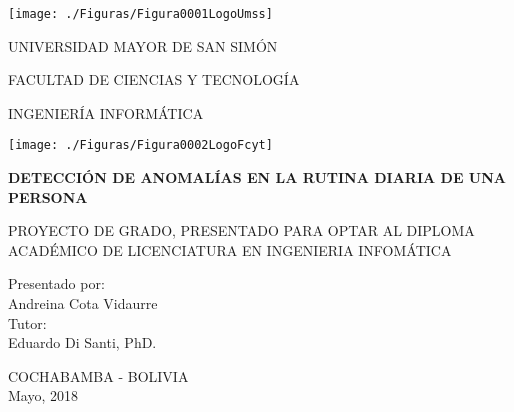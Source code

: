 \begin{titlepage}

\begin{minipage}[l]{.15\linewidth}
\texttt{[image: ./Figuras/Figura0001LogoUmss]}
\end{minipage}
\begin{minipage}[c]{.65\textwidth}
\begin{center}
UNIVERSIDAD MAYOR DE SAN SIM\'ON

FACULTAD DE CIENCIAS Y TECNOLOG\'IA

INGENIER\'IA INFORM\'ATICA
\end{center}
\end{minipage}
\begin{minipage}[r]{.15\linewidth}
\texttt{[image: ./Figuras/Figura0002LogoFcyt]}
\end{minipage}

\vfill
\begin{center}
\huge {\bf DETECCI\'ON DE ANOMAL\'IAS EN LA RUTINA DIARIA DE UNA PERSONA}	
\end{center}
\singlespacing
\singlespacing
\singlespacing
\begin{center}
{\large PROYECTO DE GRADO, PRESENTADO PARA OPTAR AL DIPLOMA ACAD\'EMICO DE LICENCIATURA EN INGENIERIA INFOM\'ATICA}
\end{center}
\vspace{\fill}

\begin{center}
{\Large Presentado por:}\\

\hspace{ 0.55\textwidth} \Large {Andreina Cota Vidaurre}\\

\hspace{ -0.13\textwidth} {\Large Tutor:}\\

\hspace{ 0.55\textwidth} {\Large Eduardo Di Santi, PhD.}\\

\hspace{ 0.35\textwidth} 
\end{center}

\vspace*{0.2cm}
 
\begin{center}
\vspace*{1.5cm}
\Large{COCHABAMBA - BOLIVIA}\hspace*{1cm}\Large{\\Mayo, 2018}	
\end{center}	
	
\end{titlepage}